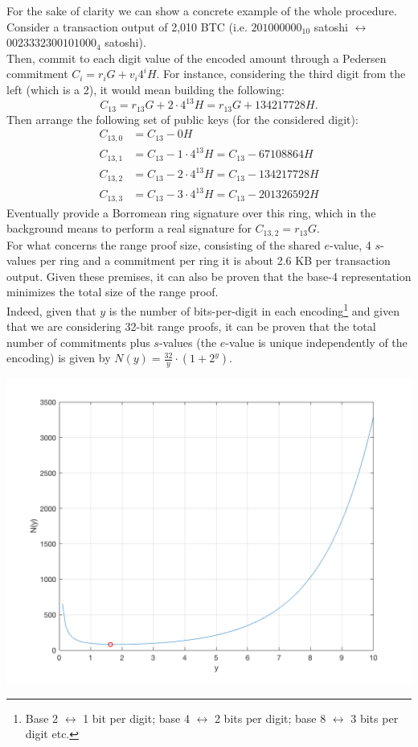 For the sake of clarity we can show a concrete example of the whole procedure.\\
Consider a transaction output of 2,010 BTC (i.e. $201000000_{10}$ satoshi $\leftrightarrow$ $0023332300101000_4$ satoshi).\\
Then, commit to each digit value of the encoded amount through a Pedersen commitment $C_i = r_iG + v_i4^iH$. For instance, considering the third digit from the left (which is a 2), it would mean building the following:
\begin{equation*}
    C_{13} = r_{13}G + 2\cdot4^{13}H = r_{13}G + 134217728H.
\end{equation*}
Then arrange the following set of public keys (for the considered digit):
\begin{align*}
        C_{13,0} &= C_{13} - 0H\\ 
        C_{13,1} &= C_{13} - 1\cdot4^{13}H = C_{13} - 67108864H\\
        C_{13,2} &= C_{13} - 2\cdot4^{13}H = C_{13} - 134217728H\\
        C_{13,3} &= C_{13} - 3\cdot4^{13}H = C_{13} - 201326592H
\end{align*}
Eventually provide a Borromean ring signature over this ring, which in the background means to perform a real signature for $C_{13,2} = r_{13}G$.\\
For what concerns the range proof size, consisting of the shared $e$-value, 4 $s$-values per ring and a commitment per ring it is about 2.6 KB per transaction output. Given these premises, it can also be proven that the base-4 representation minimizes the total size of the range proof.\\
Indeed, given that $y$ is the number of bits-per-digit in each encoding\footnote{Base 2 $\leftrightarrow$ 1 bit per digit; base 4 $\leftrightarrow$ 2 bits per digit; base 8 $\leftrightarrow$ 3 bits per digit etc.} and given that we are considering 32-bit range proofs, it can be proven that the total number of commitments plus $s$-values (the $e$-value is unique independently of the encoding) is given by $N(y) = \frac{32}{y}\cdot(1+2^y)$.
\begin{center}
\includegraphics[scale = 0.25]{Images/N_y.png}%
\label{fig:N_y}
\end{center}
